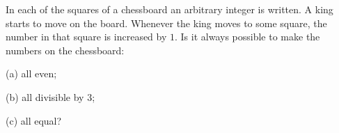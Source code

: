 In each of the squares of a chessboard an arbitrary integer is written. A king starts to move on the board. Whenever the king moves to some square, the number in that square is increased by $1$. Is it always possible to make the numbers on the chessboard:

(a) all even;

(b) all divisible by $3$;

(c) all equal?